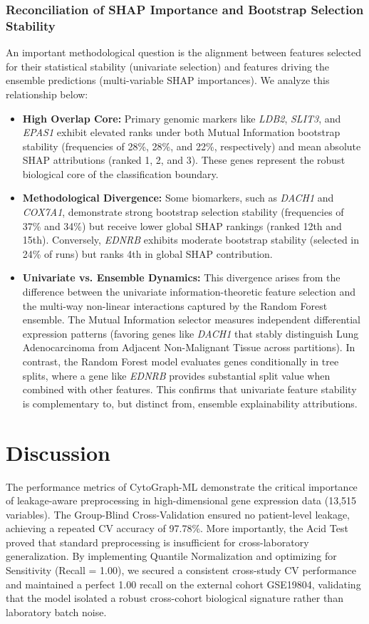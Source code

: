 \documentclass[journal,10pt]{IEEEtran}
\begin{document}
\subsubsection{Reconciliation of SHAP Importance and Bootstrap Selection Stability}
An important methodological question is the alignment between features selected for their statistical stability (univariate selection) and features driving the ensemble predictions (multi-variable SHAP importances). We analyze this relationship below:
\begin{itemize}
    \item \textbf{High Overlap Core:} Primary genomic markers like \textit{LDB2}, \textit{SLIT3}, and \textit{EPAS1} exhibit elevated ranks under both Mutual Information bootstrap stability (frequencies of 28\%, 28\%, and 22\%, respectively) and mean absolute SHAP attributions (ranked 1, 2, and 3). These genes represent the robust biological core of the classification boundary.
    \item \textbf{Methodological Divergence:} Some biomarkers, such as \textit{DACH1} and \textit{COX7A1}, demonstrate strong bootstrap selection stability (frequencies of 37\% and 34\%) but receive lower global SHAP rankings (ranked 12th and 15th). Conversely, \textit{EDNRB} exhibits moderate bootstrap stability (selected in 24\% of runs) but ranks 4th in global SHAP contribution.
    \item \textbf{Univariate vs. Ensemble Dynamics:} This divergence arises from the difference between the univariate information-theoretic feature selection and the multi-way non-linear interactions captured by the Random Forest ensemble. The Mutual Information selector measures independent differential expression patterns (favoring genes like \textit{DACH1} that stably distinguish Lung Adenocarcinoma from Adjacent Non-Malignant Tissue across partitions). In contrast, the Random Forest model evaluates genes conditionally in tree splits, where a gene like \textit{EDNRB} provides substantial split value when combined with other features. This confirms that univariate feature stability is complementary to, but distinct from, ensemble explainability attributions.
\end{itemize}



\section{Discussion}
The performance metrics of CytoGraph-ML demonstrate the critical importance of leakage-aware preprocessing in high-dimensional gene expression data (13,515 variables). The Group-Blind Cross-Validation ensured no patient-level leakage, achieving a repeated CV accuracy of 97.78\%. More importantly, the Acid Test proved that standard preprocessing is insufficient for cross-laboratory generalization. By implementing Quantile Normalization and optimizing for Sensitivity (Recall = 1.00), we secured a consistent cross-study CV performance and maintained a perfect 1.00 recall on the external cohort GSE19804, validating that the model isolated a robust cross-cohort biological signature rather than laboratory batch noise.
\end{document}
